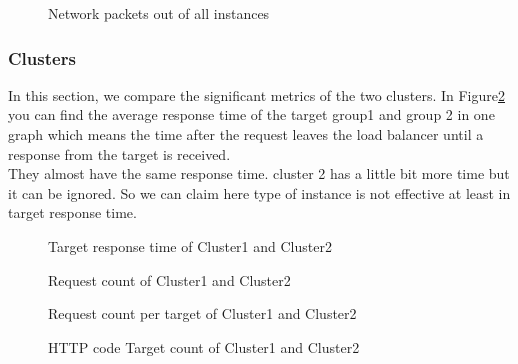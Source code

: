 \documentclass[12pt]{article}
\begin{document}
    \begin{figure}[htpb]
        \centering
            \caption{Network packets out of all instances}
            \label{fig:netout}
        \end{figure}


        
        \subsubsection{Clusters}
            In this section, we compare the significant metrics of the two clusters. In Figure\ref{fig:targerresponsetimec12} you can find the average response time of the target group1 and group 2 in one graph which means the time after the request leaves the load balancer until a response from the target is received.\\
            They almost have the same response time. cluster 2 has a little bit more time but it can be ignored. So we can claim here type of instance is not effective at least in target response time.\\
          
                \begin{figure}[htpb]
                \centering
                    \caption{Target response time of Cluster1 and Cluster2}
                    \label{fig:targerresponsetimec12}
                \end{figure}




                
                \begin{figure}[htpb]
                \centering
                    \caption{Request count of Cluster1 and Cluster2}
                    \label{fig:reqtimecountc12}
                \end{figure}
                \begin{figure}[htpb]
                \centering
                    \caption{Request count per target of Cluster1 and Cluster2}
                    \label{fig:reqtargetcount}
                \end{figure}
                \begin{figure}[htpb]
                \centering
                    \caption{HTTP code Target count of Cluster1 and Cluster2}
                    \label{fig:httpcountc12}
                \end{figure}
           
\end{document}
